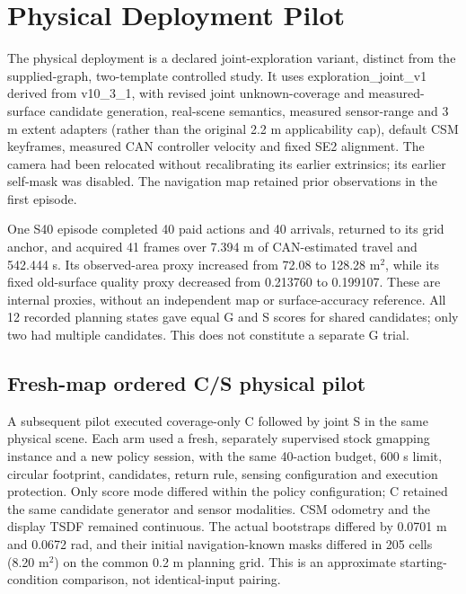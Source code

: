 \clearpage
\section{Physical Deployment Pilot}\label{physical-deployment}
The physical deployment is a declared joint-exploration variant, distinct from the supplied-graph, two-template controlled study. It uses exploration\_joint\_v1 derived from v10\_3\_1, with revised joint unknown-coverage and measured-surface candidate generation, real-scene semantics, measured sensor-range and 3 m extent adapters (rather than the original 2.2 m applicability cap), default CSM keyframes, measured CAN controller velocity and fixed SE2 alignment. The camera had been relocated without recalibrating its earlier extrinsics; its earlier self-mask was disabled. The navigation map retained prior observations in the first episode.

One S40 episode completed 40 paid actions and 40 arrivals, returned to its grid anchor, and acquired 41 frames over 7.394 m of CAN-estimated travel and 542.444 s. Its observed-area proxy increased from 72.08 to 128.28 m$^2$, while its fixed old-surface quality proxy decreased from 0.213760 to 0.199107. These are internal proxies, without an independent map or surface-accuracy reference. All 12 recorded planning states gave equal G and S scores for shared candidates; only two had multiple candidates. This does not constitute a separate G trial.

\subsection{Fresh-map ordered C/S physical pilot}

A subsequent pilot executed coverage-only C followed by joint S in the same physical scene. Each arm used a fresh, separately supervised stock gmapping instance and a new policy session, with the same 40-action budget, 600 s limit, circular footprint, candidates, return rule, sensing configuration and execution protection. Only score mode differed within the policy configuration; C retained the same candidate generator and sensor modalities. CSM odometry and the display TSDF remained continuous. The actual bootstraps differed by 0.0701 m and 0.0672 rad, and their initial navigation-known masks differed in 205 cells (8.20 m$^2$) on the common 0.2 m planning grid. This is an approximate starting-condition comparison, not identical-input pairing.

